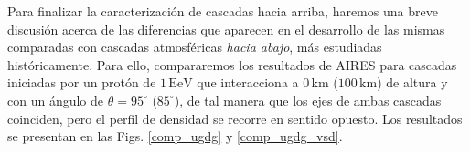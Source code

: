 \documentclass[11 pt, a4paper]{article} %
\numberwithin{equation}{section}
\numberwithin{figure}{section}
\numberwithin{table}{section}
\begin{document}

Para finalizar la caracterización de cascadas hacia arriba, haremos una breve discusión acerca de las diferencias que aparecen en el desarrollo de las mismas comparadas con cascadas atmosféricas \textit{hacia abajo}, más estudiadas históricamente. Para ello, compararemos los resultados de AIRES para cascadas iniciadas por un protón de $1\,\mathrm{EeV}$ que interacciona a $0\,\mathrm{km}$ ($100\,\mathrm{km}$) de altura y con un ángulo de $\theta=95^\circ$ ($85^\circ$), de tal manera que los ejes de ambas cascadas coinciden, pero el perfil de densidad se recorre en sentido opuesto. Los resultados se presentan en las Figs. \ref{comp_ugdg} y \ref{comp_ugdg_vsd}.
\end{document}
